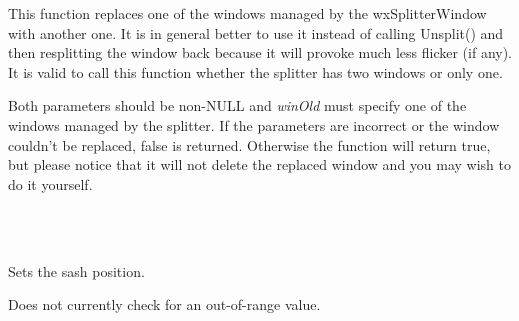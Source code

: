 \label{wxsplitterwindowreplacewindow}


This function replaces one of the windows managed by the wxSplitterWindow with
another one. It is in general better to use it instead of calling Unsplit()
and then resplitting the window back because it will provoke much less flicker
(if any). It is valid to call this function whether the splitter has two
windows or only one.

Both parameters should be non-NULL and {\it winOld} must specify one of the
windows managed by the splitter. If the parameters are incorrect or the window
couldn't be replaced, false is returned. Otherwise the function will return
true, but please notice that it will not delete the replaced window and you
may wish to do it yourself.




\\
\\

\label{wxsplitterwindowsetsashposition}


Sets the sash position.





Does not currently check for an out-of-range value.



\label{wxsplitterwindowsetminimumpanesize}

